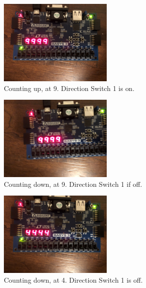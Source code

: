 \documentclass[11pt]{article}
\begin{document}
\begin{figure}[H]
\begin{center}
	\includegraphics[width=0.5\textwidth]{./images/p1/IMG_1003.jpg}
	\caption{\label{fig:counter_res3}Counting up, at 9. Direction Switch 1 is on.}
\end{center}
\end{figure}

\begin{figure}[H]
\begin{center}
	\includegraphics[width=0.5\textwidth]{./images/p1/IMG_1004.jpg}
	\caption{\label{fig:counter_res4}Counting down, at 9. Direction Switch 1 if off.}
\end{center}
\end{figure}

\begin{figure}[H]
\begin{center}
	\includegraphics[width=0.5\textwidth]{./images/p1/IMG_1005.jpg}
	\caption{\label{fig:counter_res5}Counting down, at 4. Direction Switch 1 is off.}
\end{center}
\end{figure}
\end{document}
